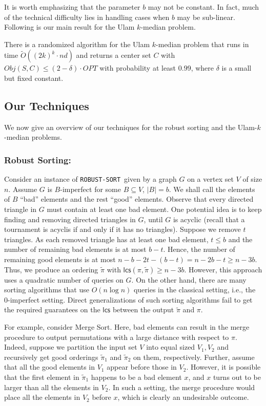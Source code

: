 \documentclass[11pt]{llncs}
\newcommand{\tpi}{{\widetilde \pi}}
\newcommand{\lcs}{{\textsf{lcs}}}
\newcommand{\RS}{{\texttt{ROBUST-SORT}}}
\begin{document}
It is worth emphasizing that the parameter $b$ may not be constant. In fact, much of the technical difficulty lies in handling cases when $b$ may be sub-linear. 
Following is our main result for the Ulam $k$-median problem.
\begin{theorem}
There is a randomized algorithm for the Ulam $k$-median problem that runs in time $\tilde{O}((2k)^k \cdot nd)$ and returns a center set $C$ with $Obj(S, C) \leq (2-\delta) \cdot OPT$ with probability at least $0.99$, where $\delta$ is a small but fixed constant.
\end{theorem}


\subsection{Our Techniques}
We now give an overview of our techniques for the robust sorting and the Ulam-$k$-median problems. 

\subsubsection{Robust Sorting:}
Consider an instance of \RS\  given by a graph $G$ on a vertex set $V$ of size $n$. Assume $G$ is $B$-imperfect for some $B \subseteq V$, $|B|=b$. 
We shall call the elements of $B$     ``bad'' elements and the rest ``good'' elements. Observe that every directed triangle in $G$ must contain at least one bad element. One potential idea is to keep finding and removing directed triangles in $G$, until $G$ is acyclic (recall that a tournament is acyclis if and only if it has no triangles). Suppose we remove $t$ triangles. As each removed triangle has at least one bad element, $t \leq b$ and the number of remaining bad elements is at most $b - t$. Hence, the number of remaining good elements is at most $n - b - 2t - (b - t) = n - 2b - t \geq n - 3b$. Thus, we produce an ordering $\tpi$ with $\lcs(\pi, \tpi) \geq n - 3 b$. However, this approach uses a quadratic number of queries on $G$. On the other hand, there are many sorting algorithms that use $O(n \log n)$ queries in the classical setting, i.e., the 0-imperfect setting. Direct generalizations of such sorting algorithms fail to get the required guarantees on the $\lcs$ between the output $\tpi$ and $\pi$. 

For example, consider Merge Sort. 
Here, bad elements can result in the merge procedure to output permutations with a large distance with respect to $\pi$. Indeed, suppose we partition the input set $V$ into equal sized $V_1, V_2$ and recursively get good orderings $\tpi_1$ and $\tpi_2$ on them, respectively. Further, assume that all the good elements in $V_1$ appear before those in $V_2$. However, it is possible that the first element in $\tpi_1$ happens to be a bad element $x$, and $x$ turns out to be larger than all the elements in $V_2$. In such a setting, the merge procedure would place all the elements in $V_2$ before $x$, which is clearly an undesirable outcome.  
\end{document}
